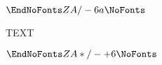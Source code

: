 \documentclass{article}
\begin{document}
\loggingall

$
\EndNoFonts 
ZA/-6 
a
\NoFonts 
$

TEXT

{
$\EndNoFonts  ZA*/-+6\NoFonts$}
\end{document}
